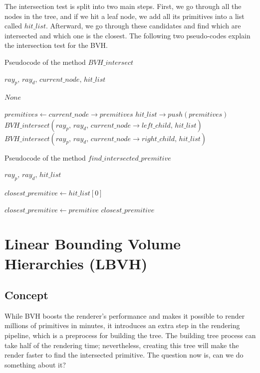 \documentclass[11pt,a4paper]{article}
\begin{document}
The intersection test is split into two main steps. First, we go through all the nodes in the tree, and if we hit a leaf node, we add all its primitives into a list called $hit\_list$. Afterward, we go through these candidates and find which are intersected and which one is the closest. The following two pseudo-codes explain the intersection test for the BVH. 

\begin{algorithm}[H]
\caption{Pseudocode of the method $BVH\_intersect$}\label{alg:alg1}
\begin{algorithmic}
\Require $ray_p,\, ray_d,\, current\_node,\, hit\_list$

\Return $None$

\State $premitives \gets current\_node \rightarrow premitives $ 
    \State $hit\_list \rightarrow push(premitives)$
\Else
\State $BVH\_intersect(ray_p,\, ray_d,\, current\_node \rightarrow left\_child,\, hit\_list)$
\State $BVH\_intersect(ray_p,\, ray_d,\, current\_node \rightarrow right\_child,\, hit\_list)$
\EndIf
\end{algorithmic}
\end{algorithm}


\begin{algorithm}[H]
\caption{Pseudocode of the method $find\_intersected\_premitive$}\label{alg:alg2}
\begin{algorithmic}
\Require $ray_p,\, ray_d,\, hit\_list$

\State $closest\_premitive \gets hit\_list[0]$
 
			\State $closest\_premitive \gets premitive$
		\EndIf
	\EndIf
\EndFor
\State \Return $closest\_premitive$
\end{algorithmic}
\end{algorithm}
\clearpage

\section{Linear Bounding Volume Hierarchies (LBVH)}
\subsection{Concept}
While BVH boosts the renderer's performance and makes it possible to render millions of primitives in minutes, it introduces an extra step in the rendering pipeline, which is a preprocess for building the tree. The building tree process can take half of the rendering time; nevertheless, creating this tree will make the render faster to find the intersected primitive. The question now is, can we do something about it? 
\end{document}
